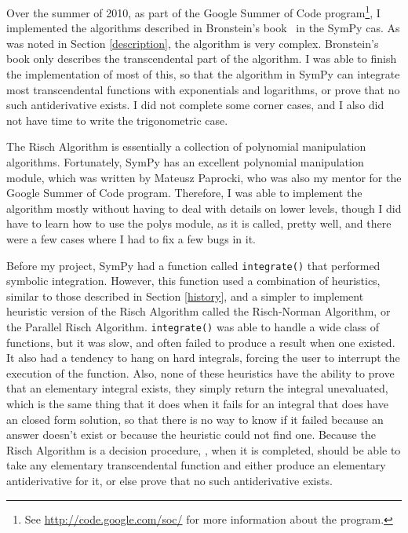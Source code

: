 Over the summer of 2010, as part of the Google Summer of Code
program\footnote{ See \url{http://code.google.com/soc/} for more
information about the program.}, I implemented the algorithms described
in Bronstein's book~\cite{bronstein2005symbolic} in the SymPy \gls{cas}.
As was noted in Section \ref{description}, the algorithm is very
complex. Bronstein's book only describes the \gls{transcendental} part
of the algorithm. I was able to finish the implementation of most of
this, so that the algorithm in SymPy can integrate most
\gls{transcendental} functions with exponentials and logarithms, or
prove that no such antiderivative exists.  I did not complete some
corner cases, and I also did not have time to write the trigonometric
case.

The Risch Algorithm is essentially a collection of polynomial
manipulation algorithms.  Fortunately, SymPy has an excellent polynomial
manipulation module, which was written by Mateusz Paprocki, who was also
my mentor for the Google Summer of Code program.  Therefore, I was able
to implement the algorithm mostly without having to deal with details on
lower levels, though I did have to learn how to use the polys module, as
it is called, pretty well, and there were a few cases where I had to fix
a few bugs in it.

Before my project, SymPy had a function called \texttt{integrate()} that
performed symbolic integration.  However, this function used a
combination of heuristics, similar to those described in Section
\ref{history}, and a simpler to implement heuristic version of the Risch
Algorithm called the Risch-Norman Algorithm, or the Parallel Risch
Algorithm.  \texttt{integrate()} was able to handle a wide class of
functions, but it was slow, and often failed to produce a result when
one existed.  It also had a tendency to hang on hard integrals, forcing
the user to interrupt the execution of the function.  Also, none of
these heuristics have the ability to prove that an \gls{elementary}
integral exists, they simply return the integral unevaluated, which is
the same thing that it does when it fails for an integral that does have
an closed form solution, so that there is no way to know if it failed
because an answer doesn't exist or because the heuristic could not find
one.  Because the Risch Algorithm is a decision procedure,
\rischintegrate{}, when it is completed, should be able to take any
\gls{elementary} \gls{transcendental} function and either produce an
\gls{elementary} antiderivative for it, or else prove that no such
antiderivative exists.  


